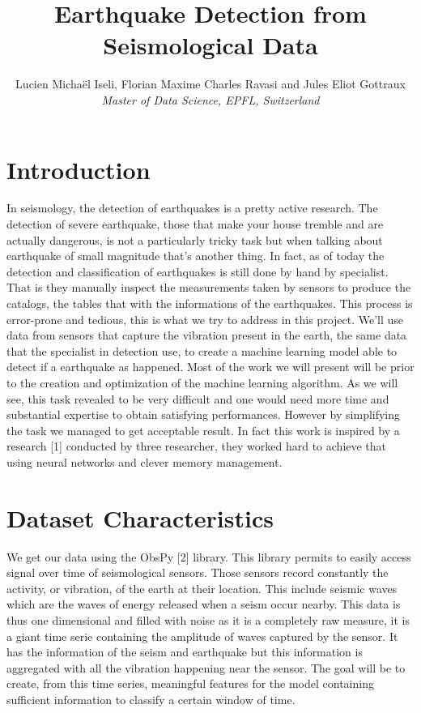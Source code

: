 \documentclass[10pt,conference,compsocconf]{IEEEtran}
\begin{document}
\title{Earthquake Detection from Seismological Data}

\author{
  Lucien Michaël Iseli, Florian Maxime Charles Ravasi and Jules Eliot Gottraux\\
  \textit{Master of Data Science, EPFL, Switzerland}
}

\maketitle
\section{Introduction}
In seismology, the detection of earthquakes is a pretty active research. The detection of severe earthquake, those that make your house tremble and are actually dangerous, is not a particularly tricky task but when talking about earthquake of small magnitude that's another thing. In fact, as of today the detection and classification of earthquakes is still done by hand by specialist. That is they manually inspect the measurements taken by sensors to produce the catalogs, the tables that with the informations of the earthquakes. This process is error-prone and tedious, this is what we try to address in this project. We'll use data from sensors that capture the vibration present in the earth, the same data that the specialist in detection use, to create a machine learning model able to detect if a earthquake as happened. Most of the work we will present will be prior to the creation and optimization of the machine learning algorithm. As we will see, this task revealed to be very difficult and one would need more time and substantial expertise to obtain satisfying performances. However by simplifying the task we managed to get acceptable result. In fact this work is inspired by a research [1] conducted by three researcher, they worked hard to achieve that using neural networks and clever memory management.

\section{Dataset Characteristics}
We get our data using the ObsPy [2] library. This library permits to easily access signal over time of seismological sensors. Those sensors record  constantly the activity, or vibration, of the earth at their location. This include seismic waves which are the waves of energy released when a seism occur nearby. This data is thus one dimensional and filled with noise as it is a completely raw measure, it is a giant time serie containing the amplitude of waves captured by the sensor. It has the information of the seism and earthquake but this information is aggregated with all the vibration happening near the sensor. The goal will be to create, from this time series, meaningful features for the model containing sufficient information to classify a certain window of time.
\end{document}
